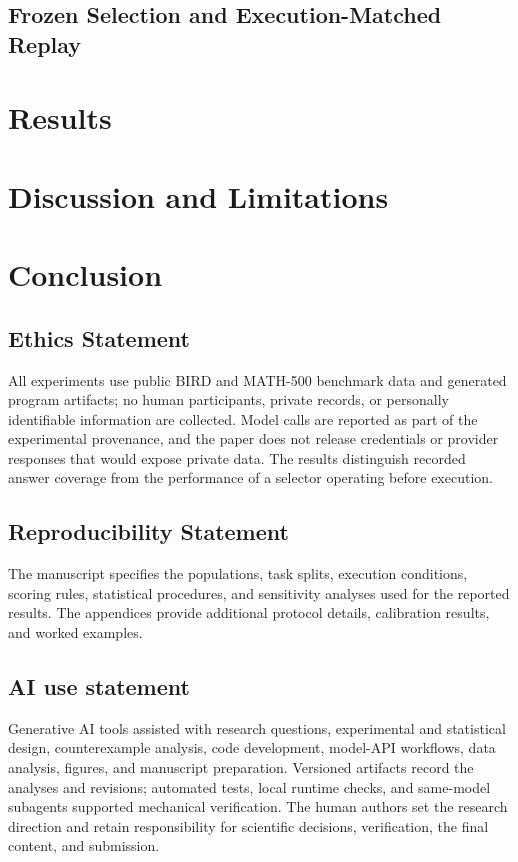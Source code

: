 \documentclass{article}
\begin{document}
\subsection{Frozen Selection and Execution-Matched Replay}\label{sec:selection-design}


\section{Results}\label{sec:results}\label{sec:diagnosis}





\section{Discussion and Limitations}\label{sec:discussion}


\section{Conclusion}\label{sec:conclusion}
\label{endofmain}

\subsection*{Ethics Statement}
All experiments use public BIRD and MATH-500 benchmark data and generated
program artifacts; no human participants, private records, or personally
identifiable information are collected.  Model calls are reported as part of
the experimental provenance, and the paper does not release credentials or
provider responses that would expose private data. The results distinguish
recorded answer coverage from the performance of a selector operating
before execution.

\subsection*{Reproducibility Statement}
The manuscript specifies the populations, task splits, execution
conditions, scoring rules, statistical procedures, and sensitivity
analyses used for the reported results. The appendices provide
additional protocol details, calibration results, and worked examples.

\subsection*{AI use statement}
Generative AI tools assisted with research questions, experimental and
statistical design, counterexample analysis, code development, model-API
workflows, data analysis, figures, and manuscript preparation. Versioned
artifacts record the analyses and revisions; automated tests, local runtime
checks, and same-model subagents supported mechanical verification.
The human authors set the research direction and retain responsibility
for scientific decisions, verification, the final content, and submission.




\appendix
\raggedbottom

\end{document}
